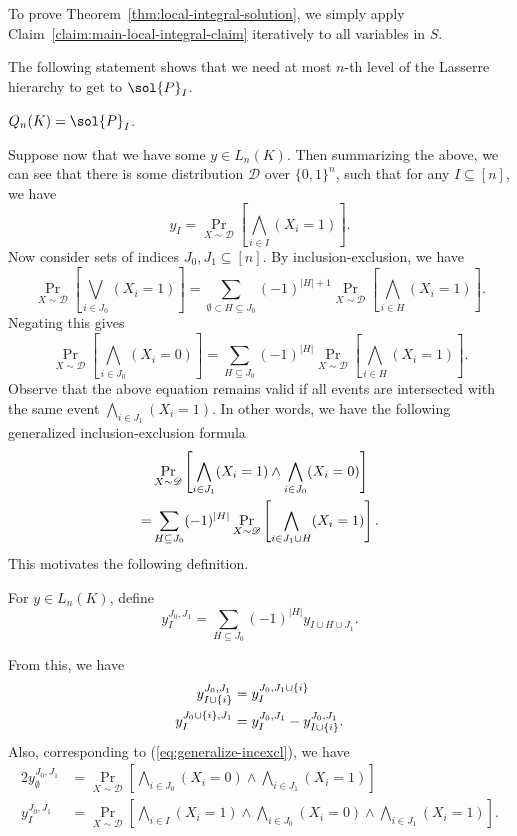 \documentclass[a4paper,twoside,justified]{tufte-handout}
\begin{document}
To prove Theorem~\ref{thm:local-integral-solution}, we simply apply Claim~\ref{claim:main-local-integral-claim}
iteratively to all variables in $S$.

The following statement shows that we need at most $n$-th level of the Lasserre hierarchy to get 
to $\sol{P}_{I}$.
\begin{corollary}
  $Q_n(K)=\sol{P}_{I}$.
\end{corollary}

Suppose now that we have some $y \in L_n(K)$. Then summarizing the above,
we can see that there is some distribution
$\mathscr{D}$ over $\{0,1\}^n$, such that for any $I \subseteq [n]$, we have
\[
y_I = \Pr_{X \sim \mathscr{D}}\left[\bigwedge_{i \in I}(X_i=1)\right].
\]
Now consider sets of indices $J_0, J_1 \subseteq [n]$. By inclusion-exclusion, we have
\[
\Pr_{X \sim \mathscr{D}}\left[ \bigvee_{i \in J_0} (X_i=1) \right]
=\sum_{\emptyset \subset H \subseteq J_0} (-1)^{|H|+1} \Pr_{X \sim \mathscr{D}}\left[ \bigwedge_{i \in H} (X_i=1) \right].
\]
Negating this gives
\[
\Pr_{X \sim \mathscr{D}}\left[ \bigwedge_{i \in J_0} (X_i=0) \right]
=\sum_{H \subseteq J_0} (-1)^{|H|} \Pr_{X \sim \mathscr{D}}\left[ \bigwedge_{i \in H} (X_i=1) \right].
\]
Observe that the above equation remains valid if all events are intersected with the same event
$\bigwedge_{i \in J_1}(X_i=1)$. In other words, we have the following generalized inclusion-exclusion formula
\begin{alignat}{2}
  & \Pr_{X \sim \mathscr{D}} \left[ \bigwedge_{i \in J_1} (X_i = 1) \wedge \bigwedge_{i \in J_0} (X_i = 0) \right] \notag \\
  =& \sum_{H \subseteq J_0} (-1)^{|H|} \Pr_{X \sim \mathscr{D}}\left[ \bigwedge_{i \in J_1 \cup H} (X_i=1) \right]. \label{eq:generalize-incexcl}
\end{alignat}
This motivates the following definition.
\begin{definition}\label{def:y-inc-exc}
  For $y \in L_n(K)$, define
  \[
  y^{J_0,J_1}_{I} = \sum_{H \subseteq J_0} (-1)^{|H|} y_{I \cup H \cup J_1}.
  \]
\end{definition}
From this, we have
\begin{alignat}{2}
  y^{J_0,J_1}_{I \cup \{i\}} &= y^{J_0,J_1 \cup \{i\}}_{I} \notag \\
  y^{J_0 \cup \{i\},J_1}_{I} &= y^{J_0,J_1}_{I}-y^{J_0,J_1}_{I \cup \{i\}}. \label{eq:yJ0J1properties}
\end{alignat}
Also, corresponding to (\ref{eq:generalize-incexcl}), we have
\begin{alignat*}{2}
  y^{J_0,J_1}_{\emptyset} &= \Pr_{X \sim \mathscr{D}} \left[ \bigwedge_{i \in J_0}(X_i=0) \wedge \bigwedge_{i \in J_1}(X_i=1) \right] \\
  y^{J_0,J_1}_{I} &= \Pr_{X \sim \mathscr{D}} \left[ \bigwedge_{i \in I}(X_i=1) \wedge 
  \bigwedge_{i \in J_0}(X_i=0) \wedge \bigwedge_{i \in J_1}(X_i=1) \right].
\end{alignat*}
\end{document}
